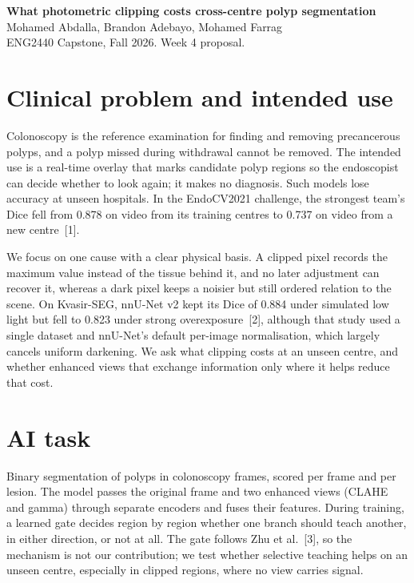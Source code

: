 \documentclass[10pt,a4paper]{article}
\begin{document}
\begin{center}
  {\Large\bfseries What photometric clipping costs cross-centre polyp segmentation}\\[4pt]
  Mohamed Abdalla, Brandon Adebayo, Mohamed Farrag\\[1pt]
  {\small ENG2440 Capstone, Fall 2026. Week 4 proposal.}
\end{center}

\section{Clinical problem and intended use}

Colonoscopy is the reference examination for finding and removing precancerous polyps, and a polyp
missed during withdrawal cannot be removed. The intended use is a real-time overlay that marks
candidate polyp regions so the endoscopist can decide whether to look again; it makes no diagnosis.
Such models lose accuracy at unseen hospitals. In the EndoCV2021 challenge, the strongest team's Dice
fell from 0.878 on video from its training centres to 0.737 on video from a new centre~[1].

We focus on one cause with a clear physical basis. A clipped pixel records the maximum value instead
of the tissue behind it, and no later adjustment can recover it, whereas a dark pixel keeps a noisier
but still ordered relation to the scene. On Kvasir-SEG, nnU-Net v2 kept its Dice of 0.884 under
simulated low light but fell to 0.823 under strong overexposure~[2], although that study used a single dataset and nnU-Net's default per-image normalisation, which largely cancels uniform darkening. We ask what
clipping costs at an unseen centre, and whether enhanced views that exchange information only where
it helps reduce that cost.

\section{AI task}

Binary segmentation of polyps in colonoscopy frames, scored per frame and per lesion. The model passes
the original frame and two enhanced views (CLAHE and gamma) through separate encoders and fuses their features. During training, a learned gate decides region by region whether one branch
should teach another, in either direction, or not at all. The gate follows Zhu et al.~[3], so the
mechanism is not our contribution; we test whether selective teaching helps on an unseen centre,
especially in clipped regions, where no view carries signal.
\end{document}
